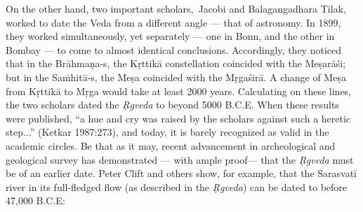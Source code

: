 On the other hand, two important scholars,\, Jacobi and Balagangadhara Tilak, worked to date the Veda from a different angle --- that of astronomy. In 1899, they worked simultaneously, yet separately --- one in Bonn, and the other in Bombay --- to come to almost identical conclusions. Accordingly, they noticed that in the Brāhmaṇa-s, the Kṛttikā constellation coincided with the Meṣarāśi; but in the \hbox{Saṁhitā-s}, the Meṣa coincided with the Mṛgaśirā. A change of Meṣa from Kṛttikā to Mṛga would take at least 2000 years. Calculating on these lines, the two scholars dated the {\sl Ṛgveda} to beyond 5000 B.C.E.  When these results were published, “a hue and cry was raised by the scholars against such a heretic step...” (Ketkar 1987:273), and today, it is barely recognized as valid in the academic circles. Be that as it may, recent advancement in archeological and geological survey has demonstrated --- with ample proof--- that the {\sl Ṛgveda} must be of an earlier date. Peter Clift and others show, for example, that the Sarasvatī river in its full-fledged flow (as described in the {\sl Ṛgveda}) can be dated to before 47,000 B.C.E: 

